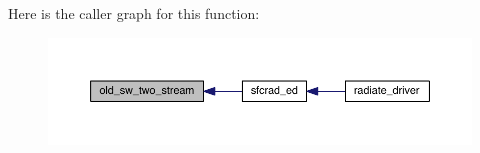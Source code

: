 Here is the caller graph for this function\+:\nopagebreak
\begin{figure}[H]
\begin{center}
\leavevmode
\includegraphics[width=350pt]{old__twostream__rad_8f90_ac90aec0e7fa711f6b96d200ae35c737a_icgraph}
\end{center}
\end{figure}



